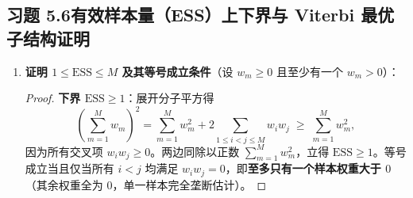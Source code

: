 \subsection*{习题 5.6\quad 有效样本量（ESS）上下界与 Viterbi 最优子结构证明}
\begin{enumerate}[label=(\arabic*), leftmargin=1.8em]
  \item \textbf{证明 $1 \le \mathrm{ESS} \le M$ 及其等号成立条件}（设 $w_m \ge 0$ 且至少有一个 $w_m > 0$）：
  \begin{proof}
  \textbf{下界 $\mathrm{ESS} \ge 1$}：展开分子平方得
  \[
    \left(\sum_{m=1}^{M} w_m\right)^2 = \sum_{m=1}^{M} w_m^2 + 2\sum_{1 \le i < j \le M} w_i w_j \;\ge\; \sum_{m=1}^{M} w_m^2,
  \]
  因为所有交叉项 $w_i w_j \ge 0$。两边同除以正数 $\sum_{m=1}^{M} w_m^2$，立得 $\mathrm{ESS} \ge 1$。等号成立当且仅当所有 $i < j$ 均满足 $w_i w_j = 0$，即\textbf{至多只有一个样本权重大于 $0$}（其余权重全为 $0$，单一样本完全垄断估计）。


\end{proof}
\end{enumerate}
